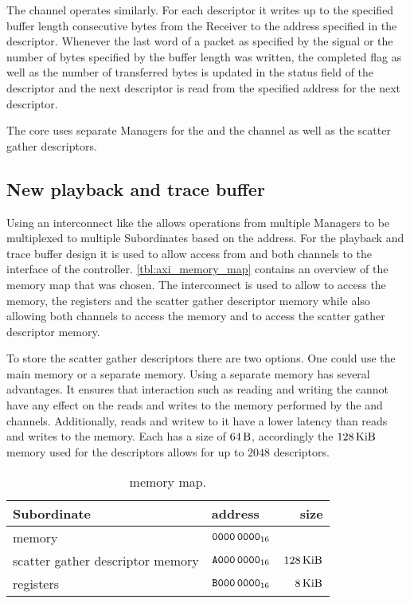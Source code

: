 The \SToMM{} channel operates similarly. For each descriptor it writes up to the specified buffer length consecutive bytes from the \SToMM{} \AXIStream{} Receiver to the address specified in the descriptor.
Whenever the last word of a packet as specified by the \TLAST{} signal or the number of bytes specified by the buffer length was written, the completed flag as well as the number of transferred bytes is updated in the status field of the descriptor and the next descriptor is read from the specified address for the next descriptor.

The \AXIDMA{} core uses separate \AXI{} Managers for the \SToMM{} and the \MMToS{} channel as well as the scatter gather descriptors.

\subsection{New playback and trace buffer}
Using an \AXI{} interconnect like the \smartconnect{} allows operations from multiple \AXI{} Managers to be multiplexed to multiple \AXI{} Subordinates based on the address.
For the playback and trace buffer design it is used to allow access from \FAXI{} and both \AXIDMA{} channels to the \AXI{} interface of the \DDR{} controller.
\autoref{tbl:axi_memory_map} contains an overview of the memory map that was chosen. The interconnect is used to allow \FAXI{} to access the \DDR{} memory, the \AXIDMA{} registers and the scatter gather descriptor memory while also allowing both \AXIDMA{} channels to access the \DDR{} memory and \AXIDMA{} to access the scatter gather descriptor memory.

To store the scatter gather descriptors there are two options. One could use the main \DDR{} memory or a separate memory. Using a separate memory has several advantages. It ensures that interaction such as reading and writing the \descriptor{} cannot have any effect on the reads and writes to the \DDR{} memory performed by the \SToMM{} and \MMToS{} channels. Additionally, reads and writew to it have a lower latency than reads and writes to the \DDR{} memory.
Each \descriptor{} has a size of $\SI{64}{\byte}$, accordingly the $\SI{128}{\kibi\byte}$ memory used for the descriptors allows for up to $\num{2048}$ descriptors.

\begin{table}
\begin{center}
\begin{tabular}{llr}
\toprule
  \AXI{} Subordinate & address & size \\
  \midrule
  \DDR{} memory & $\texttt{0000\,0000}_{16}$ & \DDRSIZE{} \\
  scatter gather descriptor memory & $\texttt{A000\,0000}_{16}$ & $\SI{128}{\kibi\byte}$ \\
  \AXIDMA{} registers & $\texttt{B000\,0000}_{16}$ & $\SI{8}{\kibi\byte}$ \\
  \bottomrule
\end{tabular}
\end{center}
\caption{\AXI{} memory map.}\label{tbl:axi_memory_map}
\end{table}

